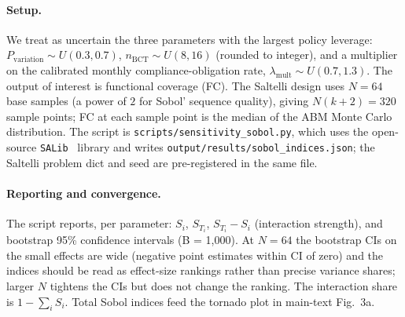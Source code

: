 \documentclass[pdflatex,sn-nature,oneside]{sn-jnl}
\begin{document}
\paragraph{Setup.}
We treat as uncertain the three parameters with the largest policy leverage:
$P_{\text{variation}} \sim U(0.3, 0.7)$, $n_{\text{BCT}} \sim U(8, 16)$
(rounded to integer), and a multiplier on the calibrated monthly
compliance-obligation rate, $\lambda_{\text{mult}} \sim U(0.7, 1.3)$.
The output of interest is functional coverage (FC). The Saltelli design uses
$N = 64$ base samples (a power of $2$ for Sobol' sequence quality), giving
$N(k+2) = 320$ sample points; FC at each sample point is the median of
the ABM Monte Carlo distribution. The script is
\texttt{scripts/sensitivity\_sobol.py}, which uses the open-source
\texttt{SALib}~\cite{HermanUsher2017} library and writes
\texttt{output/results/sobol\_indices.json}; the Saltelli problem dict
and seed are pre-registered in the same file.

\paragraph{Reporting and convergence.}
The script reports, per parameter: $S_i$, $S_{T_i}$, $S_{T_i}-S_i$
(interaction strength), and bootstrap 95\% confidence intervals
(B = 1{,}000). At $N = 64$ the bootstrap CIs on the small effects are
wide (negative point estimates within CI of zero) and the indices should
be read as effect-size rankings rather than precise variance shares;
larger $N$ tightens the CIs but does not change the ranking. The
interaction share is $1 - \sum_i S_i$. Total Sobol indices feed the
tornado plot in main-text Fig.~3a.
\end{document}
